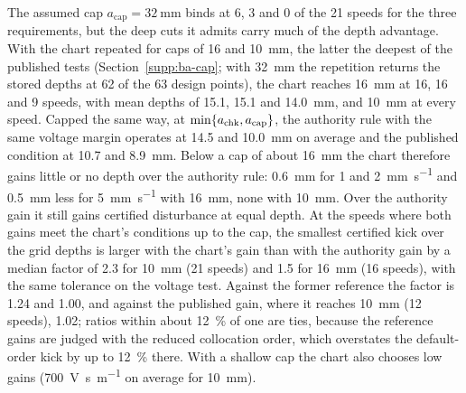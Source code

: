 
The assumed cap $a_{\mathrm{cap}}=\SI{32}{\milli\metre}$ binds at 6, 3 and 0 of the 21 speeds for the three requirements, but the deep cuts it admits carry much of the depth advantage. With the chart repeated for caps of 16 and \SI{10}{\milli\metre}, the latter the deepest of the published tests (Section~\ref{supp:ba-cap}; with \SI{32}{\milli\metre} the repetition returns the stored depths at 62 of the 63 design points), the chart reaches \SI{16}{\milli\metre} at 16, 16 and 9 speeds, with mean depths of 15.1, 15.1 and \SI{14.0}{\milli\metre}, and \SI{10}{\milli\metre} at every speed. Capped the same way, at $\min\{a_{\mathrm{chk}},a_{\mathrm{cap}}\}$, the authority rule with the same voltage margin operates at 14.5 and \SI{10.0}{\milli\metre} on average and the published condition at 10.7 and \SI{8.9}{\milli\metre}. Below a cap of about \SI{16}{\milli\metre} the chart therefore gains little or no depth over the authority rule: \SI{0.6}{\milli\metre} for 1 and \SI{2}{\milli\metre\per\second} and \SI{0.5}{\milli\metre} less for \SI{5}{\milli\metre\per\second} with \SI{16}{\milli\metre}, none with \SI{10}{\milli\metre}. Over the authority gain it still gains certified disturbance at equal depth. At the speeds where both gains meet the chart's conditions up to the cap, the smallest certified kick over the grid depths is larger with the chart's gain than with the authority gain by a median factor of 2.3 for \SI{10}{\milli\metre} (21 speeds) and 1.5 for \SI{16}{\milli\metre} (16 speeds), with the same tolerance on the voltage test. Against the former reference the factor is 1.24 and 1.00, and against the published gain, where it reaches \SI{10}{\milli\metre} (12 speeds), 1.02; ratios within about \SI{12}{\percent} of one are ties, because the reference gains are judged with the reduced collocation order, which overstates the default-order kick by up to \SI{12}{\percent} there. With a shallow cap the chart also chooses low gains (\SI{700}{\volt\second\per\metre} on average for \SI{10}{\milli\metre}).

